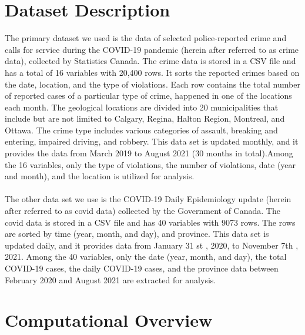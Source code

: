 \documentclass[fontsize=11pt]{article}
\begin{document}
 
\section*{Dataset Description}
The primary dataset we used is the data of selected police-reported crime and calls for service during the COVID-19 pandemic (herein after referred to as crime data), collected by Statistics Canada. The crime data is stored in a CSV file and has a total of 16 variables with 20,400 rows. It sorts the reported crimes based on the date, location, and the type of violations. Each row contains the total number of reported cases of a particular type of crime, happened in one of the locations each month. The geological locations are divided into 20 municipalities that include but are not limited to Calgary, Regina, Halton Region, Montreal, and Ottawa. The crime type includes various categories of assault, breaking and entering, impaired driving, and robbery. This data set is updated monthly, and it provides the data from March 2019 to August 2021 (30 months in total).Among the 16 variables, only the type of violations, the number of violations, date (year and month), and the location is utilized for analysis.
\\
\\
The other data set we use is the COVID-19 Daily Epidemiology update (herein after referred to as covid data) collected by the Government of Canada. The covid data is stored in a CSV file and has 40 variables with 9073 rows. The rows are sorted by time (year, month, and day), and province. This data set is updated daily, and it provides data from January 31 st , 2020, to November 7th , 2021. Among the 40 variables, only the date (year, month, and day), the total COVID-19 cases, the daily COVID-19 cases, and the province data between February 2020 and August 2021 are extracted for analysis.


\section*{Computational Overview}
\end{document}
